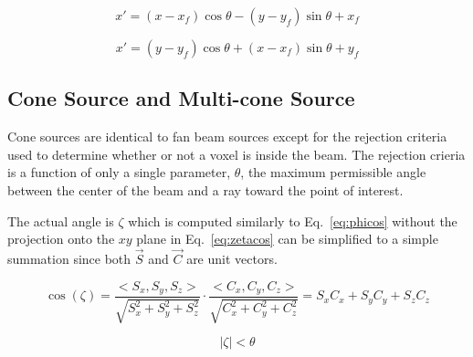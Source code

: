 \begin{equation}\label{eq:xp2}
x' = (x-x_f) \cos \theta - (y-y_f) \sin \theta + x_f
\end{equation}

\begin{equation}\label{eq:yp2}
x' = (y - y_f) \cos \theta + (x - x_f) \sin \theta + y_f
\end{equation}

\subsection{Cone Source and Multi-cone Source}
Cone sources are identical to fan beam sources except for the rejection criteria used to determine whether or not a voxel is inside the beam. The rejection crieria is a function of only a single parameter, $\theta$, the maximum permissible angle between the center of the beam and a ray toward the point of interest.

The actual angle is $\zeta$ which is computed similarly to Eq.~\ref{eq:phicos} without the projection onto the $xy$ plane in Eq.~\ref{eq:zetacos} can be simplified to a simple summation since both $\vec{S}$ and $\vec{C}$ are unit vectors.

\begin{equation}\label{eq:zetacos}
\cos(\zeta) = \frac{<S_x, S_y, S_z>}{\sqrt{S_x^2 + S_y^2 + S_z^2}} \cdot \frac{<C_x, C_y, C_z>}{\sqrt{C_x^2 + C_y^2 + C_z^2}} = S_x C_x + S_y C_y + S_z C_z
\end{equation}

\begin{equation}\label{eq:zetacon}
|\zeta| < \theta
\end{equation}

